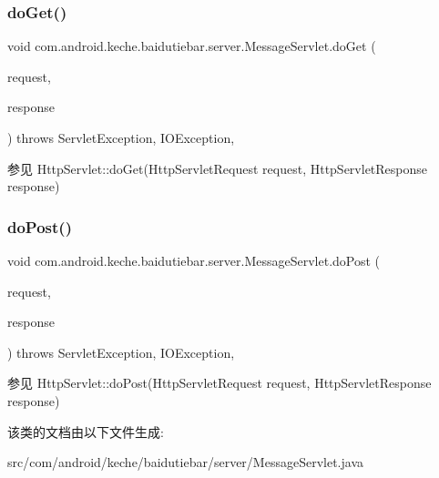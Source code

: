 \subsubsection{\texorpdfstring{do\+Get()}{doGet()}}
{\footnotesize\ttfamily void com.\+android.\+keche.\+baidutiebar.\+server.\+Message\+Servlet.\+do\+Get (\begin{DoxyParamCaption}\item[{Http\+Servlet\+Request}]{request,  }\item[{Http\+Servlet\+Response}]{response }\end{DoxyParamCaption}) throws Servlet\+Exception, I\+O\+Exception\hspace{0.3cm}{\ttfamily [inline]}, {\ttfamily [protected]}}

\begin{DoxySeeAlso}{参见}
Http\+Servlet\+::do\+Get(\+Http\+Servlet\+Request request, Http\+Servlet\+Response response) 
\end{DoxySeeAlso}
\mbox{\label{classcom_1_1android_1_1keche_1_1baidutiebar_1_1server_1_1_message_servlet_ae920f7609054c4ccff3a808c4e3ca9b0}} 
\subsubsection{\texorpdfstring{do\+Post()}{doPost()}}
{\footnotesize\ttfamily void com.\+android.\+keche.\+baidutiebar.\+server.\+Message\+Servlet.\+do\+Post (\begin{DoxyParamCaption}\item[{Http\+Servlet\+Request}]{request,  }\item[{Http\+Servlet\+Response}]{response }\end{DoxyParamCaption}) throws Servlet\+Exception, I\+O\+Exception\hspace{0.3cm}{\ttfamily [inline]}, {\ttfamily [protected]}}

\begin{DoxySeeAlso}{参见}
Http\+Servlet\+::do\+Post(\+Http\+Servlet\+Request request, Http\+Servlet\+Response response) 
\end{DoxySeeAlso}


该类的文档由以下文件生成\+:\begin{DoxyCompactItemize}
\item 
src/com/android/keche/baidutiebar/server/Message\+Servlet.\+java\end{DoxyCompactItemize}
